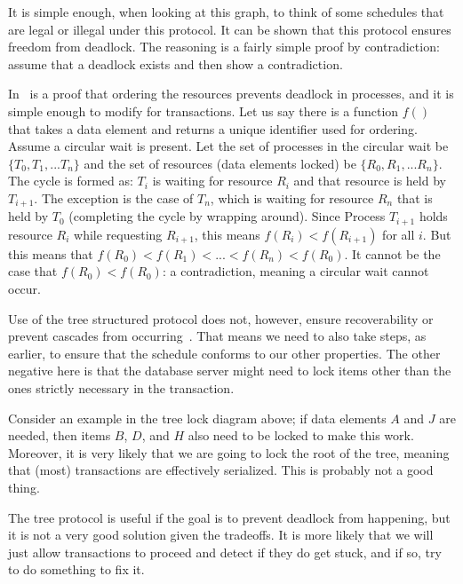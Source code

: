 \documentclass[a4paper]{report}
\begin{document}
It is simple enough, when looking at this graph, to think of some schedules that are legal or illegal under this protocol. It can be shown that this protocol ensures freedom from deadlock. The reasoning is a fairly simple proof by contradiction: assume that a deadlock exists and then show a contradiction.

In~\cite{osc} is a proof that ordering the resources prevents deadlock in processes, and it is simple enough to modify for transactions. Let us say there is a function $f()$ that takes a data element and returns a unique identifier used for ordering. Assume a circular wait is present. Let the set of processes in the circular wait be $\{T_{0}, T_{1}, ... T_{n}\}$ and the set of resources (data elements locked) be $\{R_{0}, R_{1}, ... R_{n}\}$. The cycle is formed as: $T_{i}$ is waiting for resource $R_{i}$ and that resource is held by $T_{i+1}$. The exception is the case of $T_{n}$, which is waiting for resource $R_{n}$ that is held by $T_{0}$ (completing the cycle by wrapping around). Since Process $T_{i+1}$ holds resource $R_{i}$ while requesting $R_{i+1}$, this means $f(R_{i}) < f(R_{i+1})$ for all $i$. But this means that $f(R_{0}) < f(R_{1}) < ... < f(R_{n}) < f(R_{0})$. It cannot be the case that $f(R_{0}) < f(R_{0})$: a contradiction, meaning a circular wait cannot occur.

Use of the tree structured protocol does not, however, ensure recoverability or prevent cascades from occurring~\cite{dsc}. That means we need to also take steps, as earlier, to ensure that the schedule conforms to our other properties. The other negative here is that the database server might need to lock items other than the ones strictly necessary in the transaction.

Consider an example in the tree lock diagram above; if data elements $A$ and $J$ are needed, then items $B$, $D$, and $H$ also need to be locked to make this work. Moreover, it is very likely that we are going to lock the root of the tree, meaning that (most) transactions are effectively serialized. This is probably not a good thing.

The tree protocol is useful if the goal is to prevent deadlock from happening, but it is not a very good solution given the tradeoffs. It is more likely that we will just allow transactions to proceed and detect if they do get stuck, and if so, try to do something to fix it.
\end{document}
